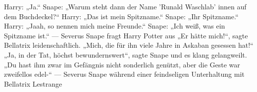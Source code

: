 \documentclass[a4paper, 10pt]{article}
\begin{document}
\vspace{10pt}
\newline
Harry: „Ja.“
\vspace{10pt}
\newline
Snape: „Warum steht dann der Name 'Runald Waschlab' innen auf dem Buchdeckel?“
\vspace{10pt}
\newline
Harry: „Das ist mein Spitzname.“
\vspace{10pt}
\newline
Snape: „Ihr Spitzname.“
\vspace{10pt}
\newline
Harry: „Jaah, so nennen mich meine Freunde.“
\vspace{10pt}
\newline
Snape: „Ich weiß, was ein Spitzname ist.“
\vspace{10pt}
\newline
— Severus Snape fragt Harry Potter aus
\vspace{10pt}
\newline
„Er hätte mich!“, sagte Bellatrix leidenschaftlich. „Mich, die für ihn viele Jahre in Askaban gesessen hat!“
\vspace{10pt}
\newline
„Ja, in der Tat, höchst bewundernswert“, sagte Snape und es klang gelangweilt. „Du hast ihm zwar im Gefängnis nicht sonderlich genützt, aber die Geste war zweifellos edel-“
— Severus Snape während einer feindseligen Unterhaltung mit Bellatrix Lestrange
\end{document}
